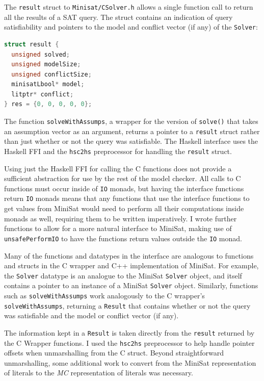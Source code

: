 \documentclass[12pt,a4paper,twoside,openright]{report}
\begin{document}
{The \verb,result, struct to \verb,Minisat/CSolver.h,
allows a single function call to return
all the results of a SAT query. The struct contains an indication of query satisfiability
and pointers to the model and conflict vector (if any) of the \verb,Solver,:
\begin{lstlisting}[language=C]
struct result {
  unsigned solved;
  unsigned modelSize;
  unsigned conflictSize;
  minisatLbool* model;
  litptr* conflict;
} res = {0, 0, 0, 0, 0};
\end{lstlisting}

The function \verb,solveWithAssumps,, a wrapper for the version of \verb,solve(),
that takes an assumption vector as an argument, returns a pointer to a
\verb,result, struct rather than just whether or not the query was satisfiable.
The Haskell interface uses the Haskell FFI and the \verb,hsc2hs, preprocessor
for handling the \verb,result, struct.

Using just the Haskell FFI for calling the C functions does not provide a
sufficient abstraction for use by the rest of the model checker. All
calls to C functions must occur inside of \verb,IO, monads, but having
the interface functions return \verb,IO, monads means that any functions
that use the interface functions to get values from MiniSat would need to
perform all their computations inside monads as well, requiring them to
be written imperatively.
I wrote further functions to allow for a more natural interface to MiniSat,
making use of \verb,unsafePerformIO, to have the functions return
values outside the \verb,IO, monad.

Many of the functions and datatypes in the interface are analogous to functions and structs in
the C wrapper and C++ implementation of MiniSat. For example, the \verb,Solver, datatype is an
analogue to the MiniSat \verb,Solver, object, and itself contains a pointer to an instance of
a MiniSat \verb,Solver, object. Similarly, functions such as \verb,solveWithAssumps, work
analogously to the C wrapper's \verb,solveWithAssumps,, returning a \verb,Result, that contains
whether or not the query was satisfiable and the model or conflict vector (if any).

The information kept in a \verb,Result, is taken directly from the \verb,result, returned by
the C Wrapper functions. I used the \verb,hsc2hs, preprocessor to help handle pointer offsets
when unmarshalling from the C struct. Beyond straightforward unmarshalling, some additional work
to convert from the MiniSat representation of literals to the \emph{MC} representation of
literals was necessary.

}
\end{document}
